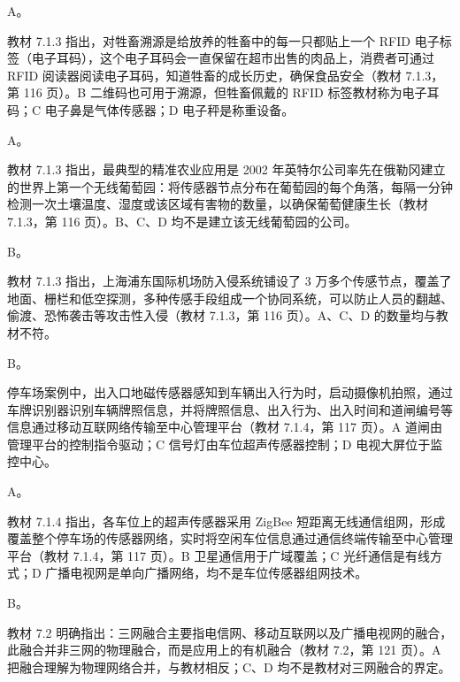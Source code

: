 \documentclass[a4paper,11pt]{article}
\begin{document}


\q A。\begin{analysis}教材 7.1.3 指出，对牲畜溯源是给放养的牲畜中的每一只都贴上一个 RFID 电子标签（电子耳码），这个电子耳码会一直保留在超市出售的肉品上，消费者可通过 RFID 阅读器阅读电子耳码，知道牲畜的成长历史，确保食品安全（教材 7.1.3，第 116 页）。B 二维码也可用于溯源，但牲畜佩戴的 RFID 标签教材称为电子耳码；C 电子鼻是气体传感器；D 电子秤是称重设备。\end{analysis}

\q A。\begin{analysis}教材 7.1.3 指出，最典型的精准农业应用是 2002 年英特尔公司率先在俄勒冈建立的世界上第一个无线葡萄园：将传感器节点分布在葡萄园的每个角落，每隔一分钟检测一次土壤温度、湿度或该区域有害物的数量，以确保葡萄健康生长（教材 7.1.3，第 116 页）。B、C、D 均不是建立该无线葡萄园的公司。\end{analysis}

\q B。\begin{analysis}教材 7.1.3 指出，上海浦东国际机场防入侵系统铺设了 3 万多个传感节点，覆盖了地面、栅栏和低空探测，多种传感手段组成一个协同系统，可以防止人员的翻越、偷渡、恐怖袭击等攻击性入侵（教材 7.1.3，第 116 页）。A、C、D 的数量均与教材不符。\end{analysis}

\q B。\begin{analysis}停车场案例中，出入口地磁传感器感知到车辆出入行为时，启动摄像机拍照，通过车牌识别器识别车辆牌照信息，并将牌照信息、出入行为、出入时间和道闸编号等信息通过移动互联网络传输至中心管理平台（教材 7.1.4，第 117 页）。A 道闸由管理平台的控制指令驱动；C 信号灯由车位超声传感器控制；D 电视大屏位于监控中心。\end{analysis}

\q A。\begin{analysis}教材 7.1.4 指出，各车位上的超声传感器采用 ZigBee 短距离无线通信组网，形成覆盖整个停车场的传感器网络，实时将空闲车位信息通过通信终端传输至中心管理平台（教材 7.1.4，第 117 页）。B 卫星通信用于广域覆盖；C 光纤通信是有线方式；D 广播电视网是单向广播网络，均不是车位传感器组网技术。\end{analysis}

\q B。\begin{analysis}教材 7.2 明确指出：三网融合主要指电信网、移动互联网以及广播电视网的融合，此融合并非三网的物理融合，而是应用上的有机融合（教材 7.2，第 121 页）。A 把融合理解为物理网络合并，与教材相反；C、D 均不是教材对三网融合的界定。\end{analysis}
\end{document}

